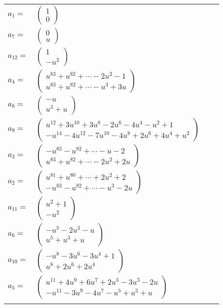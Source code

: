 \documentclass[1p]{elsarticle_modified}
\theoremstyle{definition}
\begin{document}
\begin{tabular}{m{7pt} m{180pt} m{7pt} m{180pt} }
\flushright $a_{1}=$&$\begin{pmatrix}1\\0\end{pmatrix}$ \\
\flushright $a_{7}=$&$\begin{pmatrix}0\\u\end{pmatrix}$ \\
\flushright $a_{12}=$&$\begin{pmatrix}1\\- u^2\end{pmatrix}$ \\
\flushright $a_{4}=$&$\begin{pmatrix}u^{83}+u^{82}+\cdots-2 u^2-1\\u^{83}+u^{82}+\cdots- u^3+3 u\end{pmatrix}$ \\
\flushright $a_{8}=$&$\begin{pmatrix}- u\\u^3+u\end{pmatrix}$ \\
\flushright $a_{9}=$&$\begin{pmatrix}u^{12}+3 u^{10}+3 u^8-2 u^6-4 u^4- u^2+1\\- u^{14}-4 u^{12}-7 u^{10}-4 u^8+2 u^6+4 u^4+u^2\end{pmatrix}$ \\
\flushright $a_{3}=$&$\begin{pmatrix}- u^{83}- u^{82}+\cdots- u-2\\u^{83}+u^{82}+\cdots-2 u^2+2 u\end{pmatrix}$ \\
\flushright $a_{2}=$&$\begin{pmatrix}u^{81}+u^{80}+\cdots+2 u^2+2\\- u^{83}- u^{82}+\cdots- u^3-2 u\end{pmatrix}$ \\
\flushright $a_{11}=$&$\begin{pmatrix}u^2+1\\- u^2\end{pmatrix}$ \\
\flushright $a_{6}=$&$\begin{pmatrix}- u^5-2 u^3- u\\u^5+u^3+u\end{pmatrix}$ \\
\flushright $a_{10}=$&$\begin{pmatrix}- u^8-3 u^6-3 u^4+1\\u^8+2 u^6+2 u^4\end{pmatrix}$ \\
\flushright $a_{5}=$&$\begin{pmatrix}u^{11}+4 u^9+6 u^7+2 u^5-3 u^3-2 u\\- u^{11}-3 u^9-4 u^7- u^5+u^3+u\end{pmatrix}$\\&\end{tabular}
\end{document}
